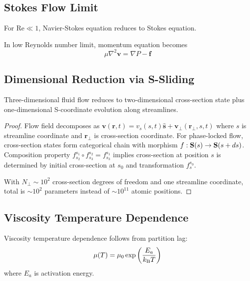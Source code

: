 \subsection{Stokes Flow Limit}

For $\text{Re} \ll 1$, Navier-Stokes equation reduces to Stokes equation.

\begin{corollary}
In low Reynolds number limit, momentum equation becomes
\begin{equation}
\mu\nabla^2\mathbf{v} = \nabla P - \mathbf{f}
\end{equation}
\end{corollary}

\subsection{Dimensional Reduction via S-Sliding}

\begin{theorem}
\label{thm:cross_section}
Three-dimensional fluid flow reduces to two-dimensional cross-section state plus one-dimensional S-coordinate evolution along streamlines.
\end{theorem}

\begin{proof}
Flow field decomposes as $\mathbf{v}(\mathbf{r},t) = v_s(s,t)\hat{\mathbf{s}} + \mathbf{v}_{\perp}(\mathbf{r}_{\perp},s,t)$ where $s$ is streamline coordinate and $\mathbf{r}_{\perp}$ is cross-section coordinate. For phase-locked flow, cross-section states form categorical chain with morphism $f: \mathbf{S}(s) \to \mathbf{S}(s+ds)$. Composition property $f_{s_2}^{s_1} \circ f_{s_3}^{s_2} = f_{s_3}^{s_1}$ implies cross-section at position $s$ is determined by initial cross-section at $s_0$ and transformation $f_s^{s_0}$.

With $N_{\perp} \sim 10^2$ cross-section degrees of freedom and one streamline coordinate, total is $\sim 10^2$ parameters instead of $\sim 10^{11}$ atomic positions.
\end{proof}

\subsection{Viscosity Temperature Dependence}

\begin{theorem}
Viscosity temperature dependence follows from partition lag:
\begin{equation}
\mu(T) = \mu_0 \exp\left(\frac{E_a}{k_{\mathrm{B}} T}\right)
\end{equation}
where $E_a$ is activation energy.
\end{theorem}

